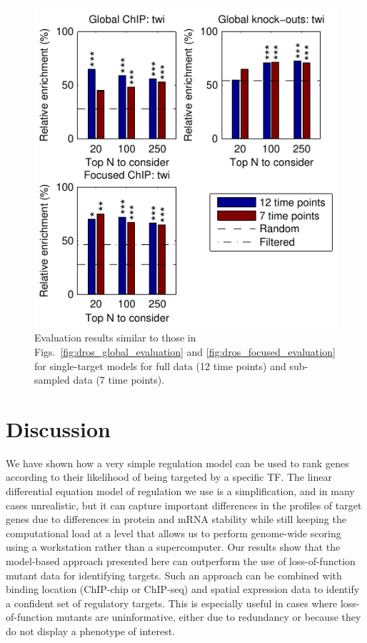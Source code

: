 \documentclass{pnastwo}
\begin{document}
\begin{article}
\begin{figure}[tb]
  \centering
  \includegraphics{dros_data_size_evaluation}
  \caption{Evaluation results similar to those in 
    Figs.~\ref{fig:dros_global_evaluation} and 
    \ref{fig:dros_focused_evaluation} for single-target models
    for full data (12 time points) and sub-sampled data (7 time points).
    \label{fig:dros_data_size_evaluation}
  }
\end{figure}

\section{Discussion}

We have shown how a very simple regulation model can be used to rank
genes according to their likelihood of being targeted by a specific
TF. The linear differential equation model of regulation we use is a simplification, and in
many cases unrealistic, but it can capture important differences in
the profiles of target genes due to differences in protein and mRNA
stability while still keeping the computational load at a level
that allows us to perform genome-wide scoring using a workstation
rather than a supercomputer. Our results show
that the model-based approach presented here can outperform the use of
loss-of-function mutant data for identifying targets. Such an approach
can be combined with binding location (ChIP-chip or ChIP-seq)
and spatial expression data to identify a confident set of regulatory
targets. This is especially useful in cases where loss-of-function
mutants are uninformative, either due to redundancy or because they do
not display a phenotype of interest. 


\end{article}
\end{document}
